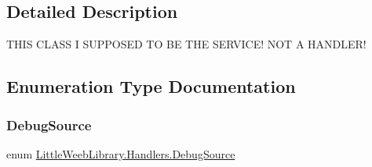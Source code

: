 \subsection{Detailed Description}
T\+H\+IS C\+L\+A\+SS I S\+U\+P\+P\+O\+S\+ED TO BE T\+HE S\+E\+R\+V\+I\+C\+E! N\+OT A H\+A\+N\+D\+L\+E\+R! 

\subsection{Enumeration Type Documentation}
\mbox{\label{namespace_little_weeb_library_1_1_handlers_a2a6ca0775121c9c503d58aa254d292be}} 
\subsubsection{\texorpdfstring{Debug\+Source}{DebugSource}}
{\footnotesize\ttfamily enum \mbox{\hyperlink{namespace_little_weeb_library_1_1_handlers_a2a6ca0775121c9c503d58aa254d292be}{Little\+Weeb\+Library.\+Handlers.\+Debug\+Source}}\hspace{0.3cm}{\ttfamily [strong]}}

